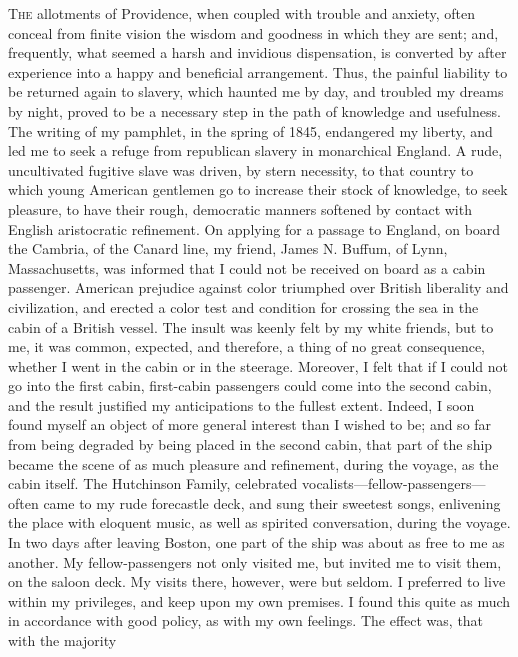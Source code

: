 \textsc{The} allotments of Providence, when coupled with trouble and
anxiety, often conceal from finite vision the wisdom and goodness in
which they are sent; and, frequently, what seemed a harsh and invidious
dispensation, is converted by after experience into a happy and
beneficial arrangement. Thus, the painful liability to be returned again
to slavery, which haunted me by day, and troubled my dreams by night,
proved to be a necessary step in the path of knowledge and usefulness.
The writing of my pamphlet, in the spring of 1845, endangered my
liberty, and led me to seek a refuge from republican slavery in
monarchical England. A rude, uncultivated fugitive slave was driven, by
stern necessity, to that country to which young American gentlemen go to
increase {\protect\hypertarget{366}{}{}}their stock of knowledge, to
seek pleasure, to have their rough, democratic manners softened by
contact with English aristocratic refinement. On applying for a passage
to England, on board the Cambria, of the Canard line, my friend, James
N. Buffum, of Lynn, Massachusetts, was informed that I could not be
received on board as a cabin passenger. American prejudice against color
triumphed over British liberality and civilization, and erected a color
test and condition for crossing the sea in the cabin of a British
vessel. The insult was keenly felt by my white friends, but to me, it
was common, expected, and therefore, a thing of no great consequence,
whether I went in the cabin or in the steerage. Moreover, I felt that if
I could not go into the first cabin, first-cabin passengers could come
into the second cabin, and the result justified my anticipations to the
fullest extent. Indeed, I soon found myself an object of more general
interest than I wished to be; and so far from being degraded by being
placed in the second cabin, that part of the ship became the scene of as
much pleasure and refinement, during the voyage, as the cabin itself.
The Hutchinson Family, celebrated vocalists---fellow-passengers---often
came to my rude forecastle deck, and sung their sweetest songs,
enlivening the place with eloquent music, as well as spirited
conversation, during the voyage. In two days after leaving Boston, one
part of the ship was about as free to me as another. My
fellow-passengers not only visited me, but invited me to visit them, on
the saloon deck. My visits there, however, were but seldom. I preferred
to live within my {\protect\hypertarget{367}{}{}}privileges, and keep
upon my own premises. I found this quite as much in accordance with good
policy, as with my own feelings. The effect was, that with the majority

